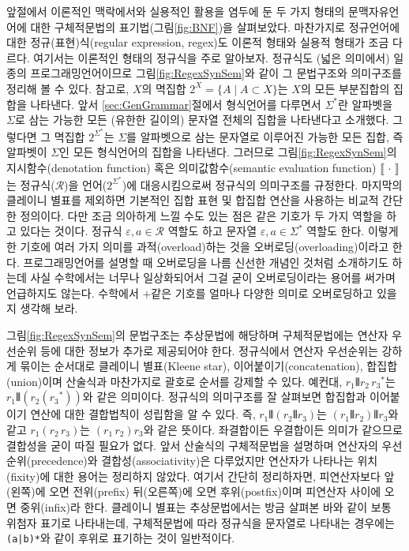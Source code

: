 앞절에서 이론적인 맥락에서와 실용적인 활용을 염두에 둔 두 가지 형태의
문맥자유언어에 대한 구체적문법의 표기법(그림\;\ref{fig:BNF})을 살펴보았다.
마찬가지로 정규언어에 대한
정규(표현)식(regular expression, regex)도
이론적 형태와 실용적 형태가 조금 다르다. 여기서는 이론적인 형태의
정규식을 주로 알아보자. 정규식도 (넓은 의미에서) 일종의 프로그래밍언어이므로
그림\;\ref{fig:RegexSynSem}와 같이 그 문법구조와 의미구조를 정리해 볼 수 있다.
참고로, $X$의 멱집합 $2^X = \{A\mid A\subset X\}$는 $X$의 모든 부분집합의
집합을 나타낸다. 앞서 \ref{sec:GenGrammar}절에서 형식언어를 다루면서
$\Sigma^{*}$란 알파벳을 $\Sigma$로 삼는 가능한 모든 (유한한 길이의)
문자열 전체의 집합을 나타낸다고 소개했다. 그렇다면 그 멱집합
$2^{\Sigma^{*}}$는 $\Sigma$를 알파벳으로 삼는 문자열로 이루어진
가능한 모든 집합, 즉 알파벳이 $\Sigma$인 모든 형식언어의 집합을 나타낸다.
그러므로 그림\;\ref{fig:RegexSynSem}의 지시함수(denotation function) 혹은
의미값함수(semantic evaluation function) $\llbracket\,\cdot\,\rrbracket$는
정규식($\mathcal{R}$)을 언어($2^{\Sigma^{*}}$)에 대응시킴으로써 정규식의
의미구조를 규정한다. 마지막의 클레이니 별표를 제외하면 기본적인 집합 표현
및 합집합 연산을 사용하는 비교적 간단한 정의이다. 다만 조금 의아하게 느낄
수도 있는 점은 같은 기호가 두 가지 역할을 하고 있다는 것이다.
정규식 $\varepsilon,a\in\mathcal{R}$ 역할도 하고
문자열 $\varepsilon,a\in\Sigma^{*}$ 역할도 한다.
이렇게 한 기호에 여러 가지 의미를 과적(overload)하는 것을
오버로딩(overloading)이라고 한다. 프로그래밍언어를 설명할
때 오버로딩을 나름 신선한 개념인 것처럼 소개하기도 하는데
사실 수학에서는 너무나 일상화되어서 그걸 굳이 오버로딩이라는
용어를 써가며 언급하지도 않는다. 수학에서 $+$같은 기호를 얼마나
다양한 의미로 오버로딩하고 있을지 생각해 보라.

그림\;\ref{fig:RegexSynSem}의 문법구조는 추상문법에 해당하며
구체적문법에는 연산자 우선순위 등에 대한 정보가 추가로 제공되어야 한다.
정규식에서 연산자 우선순위는 강하게 묶이는 순서대로
클레이니 별표(Kleene star), 이어붙이기(concatenation), 합집합(union)이며
산술식과 마찬가지로 괄호로 순서를 강제할 수 있다. 예컨대,
$r_1\VERT r_2\,{r_3}^{*}$는 $r_1\VERT(r_2({r_3}^{*}))$와 같은 의미이다.
정규식의 의미구조를 잘 살펴보면 합집합과 이어붙이기 연산에 대한
결합법칙이 성립함을 알 수 있다.
즉, $r_1\VERT(r_2\VERT r_3)$는 $(r_1\VERT r_2)\VERT r_3$와
같고 $r_1(r_2\,r_3)$는 $(r_1\,r_2)r_3$와 같은 뜻이다.
좌결합이든 우결합이든 의미가 같으므로 결합성을 굳이 따질 필요가 없다.
앞서 산술식의 구체적문법을 설명하며 연산자의 우선순위(precedence)와
결합성(associativity)은 다루었지만 연산자가 나타나는 위치(fixity)에
대한 용어는 정리하지 않았다. 여기서 간단히 정리하자면, 피연산자보다
앞(왼쪽)에 오면 전위(prefix) 뒤(오른쪽)에 오면 후위(postfix)이며
피연산자 사이에 오면 중위(infix)라 한다. 클레이니 별표는 추상문법에서는
방금 살펴본 바와 같이 보통 위첨자 표기로 나타내는데, 구체적문법에 따라
정규식을 문자열로 나타내는 경우에는 \verb/(a|b)*/와 같이 후위로
표기하는 것이 일반적이다.

